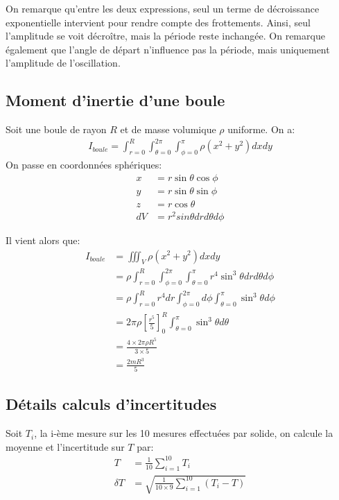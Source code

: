 \documentclass[12pt]{article}
\begin{document}
On remarque qu'entre les deux expressions, seul un terme de décroissance exponentielle intervient pour rendre compte des frottements.
Ainsi, seul l'amplitude se voit décroître, mais la période reste inchangée.
On remarque également que l'angle de départ n'influence pas la période, mais uniquement l'amplitude de l'oscillation.

\subsection{Moment d'inertie d'une boule}
\label{boule}
Soit une boule de rayon $R$ et de masse volumique $\rho$ uniforme. On a:
\begin{align}
    I_{boule} = \int_{r=0}^{R}\int_{\theta=0}^{2\pi}\int_{\phi=0}^{\pi} \rho (x^2 + y^2) dxdy
\end{align}
On passe en coordonnées sphériques:
\begin{align*}
    x &= r \sin \theta \cos \phi \\
    y &= r \sin \theta \sin \phi \\
    z &= r \cos \theta \\
    dV &= r^2 sin \theta dr d\theta d\phi
\end{align*}

\break
Il vient alors que:
\begin{align*}
    I_{boule} & = \iiint_V \rho (x^2 + y^2) dxdy \\
    & = \rho \int_{r=0}^{R}\int_{\phi=0}^{2\pi}\int_{\theta=0}^{\pi} r^4 \sin^3 \theta dr d\theta d\phi \\
    & = \rho \int_{r=0}^{R} r^4 dr \int_{\phi=0}^{2\pi} d\phi \int_{\theta=0}^{\pi} \sin^3 \theta d\phi \\
    & = 2\pi \rho \left[ \frac{r^5}{5} \right]_0^R \int_{\theta=0}^{\pi} \sin^3 \theta d\theta \\
    & = \frac{4 \times 2 \pi \rho R^5}{3 \times 5 } \\
    & = \frac{2 m R^3}{5}
\end{align*}

\subsection{Détails calculs d'incertitudes}
\label{incertitude}

Soit $T_i$, la i-ème mesure sur les 10 mesures effectuées par solide, on calcule la moyenne et l'incertitude sur $T$ par:
\begin{align*}
    T &= \frac{1}{10} \sum_{i=1}^{10} T_i \\
    \delta T &= \sqrt{\frac{1}{10 \times 9} \sum_{i=1}^{10} (T_i - T)}
\end{align*}
\end{document}
